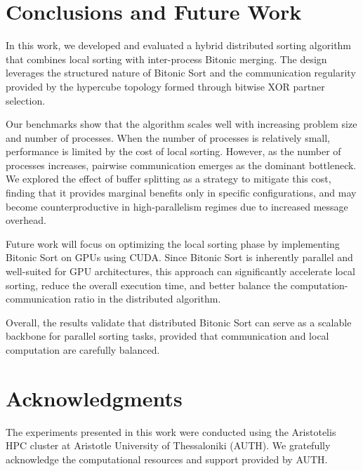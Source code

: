 \documentclass{article}
\begin{document}
\section{Conclusions and Future Work}

In this work, we developed and evaluated a hybrid distributed sorting algorithm that combines local sorting 
with inter-process Bitonic merging. The design leverages the structured nature of Bitonic Sort and the 
communication regularity provided by the hypercube topology formed through bitwise XOR partner selection.

Our benchmarks show that the algorithm scales well with increasing problem size and number of processes. 
When the number of processes is relatively small, performance is limited by the cost of local sorting. 
However, as the number of processes increases, pairwise communication emerges as the dominant bottleneck. 
We explored the effect of buffer splitting as a strategy to mitigate this cost, finding that it provides 
marginal benefits only in specific configurations, and may become counterproductive in high-parallelism 
regimes due to increased message overhead.

Future work will focus on optimizing the local sorting phase by implementing Bitonic Sort on GPUs 
using CUDA. Since Bitonic Sort is inherently parallel and well-suited for GPU architectures, this approach 
can significantly accelerate local sorting, reduce the overall execution time, and better balance the 
computation-communication ratio in the distributed algorithm.

Overall, the results validate that distributed Bitonic Sort can serve as a scalable backbone for parallel 
sorting tasks, provided that communication and local computation are carefully balanced.

\section*{Acknowledgments}

The experiments presented in this work were conducted using the Aristotelis HPC cluster at Aristotle 
University of Thessaloniki (AUTH). We gratefully acknowledge the computational resources and support 
provided by AUTH.
\end{document}
